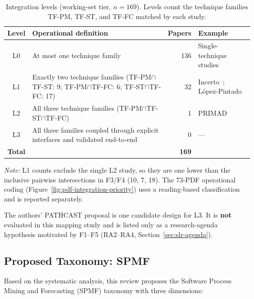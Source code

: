 \begin{table}[htbp]
\centering
\caption{Integration levels (working-set tier, $n=169$). Levels count the
technique families TF-PM, TF-ST, and TF-FC matched by each study.}
\label{tab:positioning}
\small
\begin{tabularx}{\linewidth}{@{}c X r X@{}}
\toprule
\textbf{Level} & \textbf{Operational definition} & \textbf{Papers} & \textbf{Example} \\
\midrule
L0 & At most one technique family & 136 & Single-technique studies \\
L1 & Exactly two technique families (TF-PM$\cap$TF-ST: 9;
     TF-PM$\cap$TF-FC: 6; TF-ST$\cap$TF-FC: 17) & 32
   & Incerto~\cite{incerto2025}; L\'opez-Pintado~\cite{lopezpintado2023} \\
L2 & All three technique families (TF-PM$\cap$TF-ST$\cap$TF-FC) & 1
   & PRIMAD~\cite{guinea2025} \\
L3 & All three families coupled through explicit interfaces and validated
     end-to-end & 0 & --- \\
\midrule
\textbf{Total} & & \textbf{169} & \\
\bottomrule
\end{tabularx}

\smallskip
\footnotesize\textit{Note:} L1 counts exclude the single L2 study, so they are
one lower than the inclusive pairwise intersections in F3/F4 (10, 7, 18).
The 73-PDF operational coding (Figure~\ref{fig:pdf-integration-priority}) uses
a reading-based classification and is reported separately.
\end{table}

The authors' PATHCAST proposal is one candidate design for L3. It is
\textbf{not} evaluated in this mapping study and is listed only as a
research-agenda hypothesis motivated by F1--F5 (RA2--RA4,
Section~\ref{sec:slr-agenda}).


\subsection{Proposed Taxonomy: SPMF}
\label{sec:slr-taxonomy}

Based on the systematic analysis, this review proposes the Software Process
Mining and Forecasting (SPMF) taxonomy with three dimensions:

